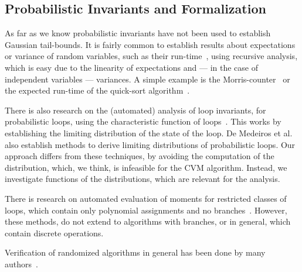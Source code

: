 \subsection{Probabilistic Invariants and Formalization}
As far as we know probabilistic invariants have not been used to establish Gaussian tail-bounds.
It is fairly common to establish results about expectations or variance of random variables, such as their run-time~\cite[Section 1.4]{motwani1995}, using recursive analysis, which is easy due to the linearity of expectations and --- in the case of independent variables --- variances.
A simple example is the Morris-counter~\cite{morris1978} or the expected run-time of the quick-sort algorithm~\cite[Section 2.5]{mitzenmacher2005}.

There is also research on the (automated) analysis of loop invariants, for probabilistic loops, using the characteristic function of loops~\cite{batz2023, mciver2005}.
This works by establishing the limiting distribution of the state of the loop.
De Medeiros et al.~\cite[Section 3.2]{demedeiros2024} also establish methods to derive limiting distributions of probabilistic loops.
Our approach differs from these techniques, by avoiding the computation of the distribution, which, we think, is infeasible for the CVM algorithm.
Instead, we investigate functions of the distributions, which are relevant for the analysis.

There is research on automated evaluation of moments for restricted classes of loops, which contain only polynomial assignments and no branches~\cite{bartocci2019,kofnov2022}.
However, these methods, do not extend to algorithms with branches, or in general, which contain discrete operations.

Verification of randomized algorithms in general has been done by many authors~\cite{bosshard2024, eberl2020, karayel2022, karayel2023, Probabilistic_Prime_Tests-AFP, tan2024}.


